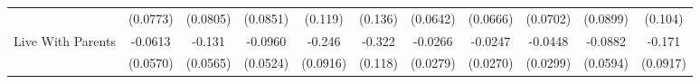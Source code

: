 {\begin{tabular}{l*{10}{c}}
            &    (0.0773)         &    (0.0805)         &    (0.0851)         &     (0.119)         &     (0.136)         &    (0.0642)         &    (0.0666)         &    (0.0702)         &    (0.0899)         &     (0.104)         \\
\addlinespace
Live With Parents&     -0.0613         &      -0.131\sym{*}  &     -0.0960         &      -0.246\sym{**} &      -0.322\sym{**} &     -0.0266         &     -0.0247         &     -0.0448         &     -0.0882         &      -0.171         \\
            &    (0.0570)         &    (0.0565)         &    (0.0524)         &    (0.0916)         &     (0.118)         &    (0.0279)         &    (0.0270)         &    (0.0299)         &    (0.0594)         &    (0.0917)         \\
\bottomrule
\end{tabular}
}
